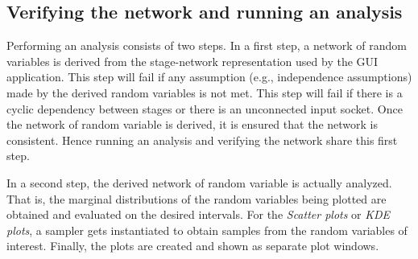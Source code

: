 \subsection{Verifying the network and running an analysis}
Performing an analysis consists of two steps. In a first step, a network of random variables is derived from the stage-network representation used by the GUI application. This step will fail if any assumption (e.g., independence assumptions) made by the derived random variables is not met. This step will fail if there is a cyclic dependency between stages or there is an unconnected input socket. Once the network of random variable is derived, it is ensured that the network is consistent. Hence running an analysis and verifying the network share this first step. 

In a second step, the derived network of random variable is actually analyzed. That is, the marginal distributions of the random variables being plotted are obtained and evaluated on the desired intervals. For the \emph{Scatter plots} or \emph{KDE plots}, a sampler gets instantiated to obtain samples from the random variables of interest. Finally, the plots are created and shown as separate plot windows.